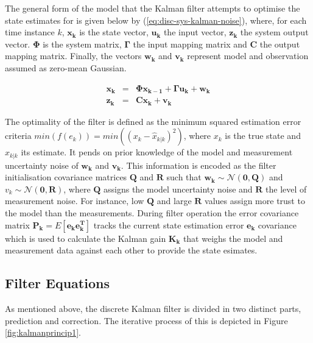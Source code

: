 \documentclass[a4paper]{report}
\begin{document}
The general form of the model that the Kalman filter attempts to optimise the state estimates for is given below by (\ref{eq:disc-sys-kalman-noise}), where, for each time instance $k$, $\mathbf{x_k}$ is the state vector, $\mathbf{u_k}$ the input vector, $\mathbf{z_k}$ the system output vector. $\mathbf{\Phi}$ is the system matrix, $\mathbf{\Gamma}$ the input mapping matrix and $\mathbf{C}$ the output mapping matrix. Finally, the vectors $\mathbf{w_k}$ and $\mathbf{v_k}$ represent model and observation assumed as zero-mean Gaussian.

\begin{eqnarray}
\mathbf{x_{k}} & = & \mathbf{\Phi x_{k-1}} + \mathbf{\Gamma u_{k}} + \mathbf{w_k} \\
\mathbf{z_k} & = & \mathbf{C x_k} + \mathbf{v_k} \nonumber
\label{eq:disc-sys-kalman-noise}
\end{eqnarray}

The optimality of the filter is defined as the minimum squared estimation error criteria $min(f(e_k))=min((x_k-\hat{x}_{k|k})^2)$, where $x_k$ is the true state and $\hat{x}_{k|k}$ its estimate. It pends on prior knowledge of the model and measurement uncertainty noise of $\mathbf{w_k}$ and $\mathbf{v_k}$. This information is encoded as the filter initialisation covariance matrices $\mathbf{Q}$ and $\mathbf{R}$ such that $\mathbf{w_k} \sim \mathcal{N}(\mathbf{0}, \mathbf{Q})$ and $v_k \sim \mathcal{N}(\mathbf{0}, \mathbf{R})$, where $\mathbf{Q}$ assigns the model uncertainty noise and $\mathbf{R}$ the level of measurement noise. For instance, low $\mathbf{Q}$ and large $\mathbf{R}$ values assign more trust to the model than the measurements. During filter operation the error covariance matrix $\mathbf{P_k} = E[\mathbf{e_k e_k^T}]$ tracks the current state estimation error $\mathbf{e_k}$ covariance which is used to calculate the Kalman gain $\mathbf{K_k}$ that weighs the model and measurement data against each other to provide the state esimates.

	\subsection{Filter Equations}
As mentioned above, the discrete Kalman filter is divided in two distinct parts, prediction and correction. The iterative process of this is depicted in Figure \ref{fig:kalmanprincip1}.
\end{document}
